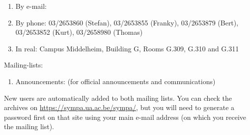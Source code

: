\begin{enumerate}
\item  By e-mail:  \hpcinfo
\item  By phone: 03/2653860 (Stefan), 03/2653855 (Franky), 03/2653879 (Bert), 03/2653852 (Kurt), 03/2658980 (Thomas)
\item  In real: Campus Middelheim, Building G, Rooms G.309, G.310 and G.311
\end{enumerate}

Mailing-lists:

\begin{enumerate}
\item  Announcements: \hpcannounceml (for official announcements and communications)
\end{enumerate}

New users are automatically added to both mailing lists.
You can check the archives on \url{https://sympa.ua.ac.be/sympa/}, but you will need to
generate a password first on that site using your main e-mail address (on which you
receive the mailing list).
